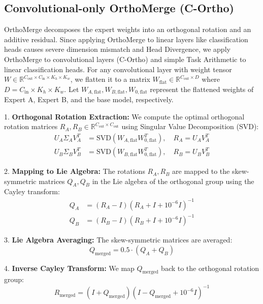 \documentclass{article}
\theoremstyle{plain}
\theoremstyle{definition}
\theoremstyle{remark}
\begin{document}
\subsection{Convolutional-only OrthoMerge (C-Ortho)}
OrthoMerge \cite{yang2026orthogonal} decomposes the expert weights into an orthogonal rotation and an additive residual. Since applying OrthoMerge to linear layers like classification heads causes severe dimension mismatch and Head Divergence, we apply OrthoMerge to convolutional layers (C-Ortho) and simple Task Arithmetic to linear classification heads.
For any convolutional layer with weight tensor $W \in \mathbb{R}^{C_{\text{out}} \times C_{\text{in}} \times K_h \times K_w}$, we flatten it to a matrix $W_{\text{flat}} \in \mathbb{R}^{C_{\text{out}} \times D}$ where $D = C_{\text{in}} \times K_h \times K_w$.
Let $W_{A,\text{flat}}, W_{B,\text{flat}}, W_{0,\text{flat}}$ represent the flattened weights of Expert A, Expert B, and the base model, respectively.

1. \textbf{Orthogonal Rotation Extraction:} We compute the optimal orthogonal rotation matrices $R_A, R_B \in \mathbb{R}^{C_{\text{out}} \times C_{\text{out}}}$ using Singular Value Decomposition (SVD):
\begin{align}
    U_A \Sigma_A V_A^T &= \text{SVD}(W_{A,\text{flat}} W_{0,\text{flat}}^T), \quad R_A = U_A V_A^T \\
    U_B \Sigma_B V_B^T &= \text{SVD}(W_{B,\text{flat}} W_{0,\text{flat}}^T), \quad R_B = U_B V_B^T
\end{align}

2. \textbf{Mapping to Lie Algebra:} The rotations $R_A, R_B$ are mapped to the skew-symmetric matrices $Q_A, Q_B$ in the Lie algebra of the orthogonal group using the Cayley transform:
\begin{align}
    Q_A &= (R_A - I)(R_A + I + 10^{-6} I)^{-1} \\
    Q_B &= (R_B - I)(R_B + I + 10^{-6} I)^{-1}
\end{align}

3. \textbf{Lie Algebra Averaging:} The skew-symmetric matrices are averaged:
\begin{equation}
    Q_{\text{merged}} = 0.5 \cdot (Q_A + Q_B)
\end{equation}

4. \textbf{Inverse Cayley Transform:} We map $Q_{\text{merged}}$ back to the orthogonal rotation group:
\begin{equation}
    R_{\text{merged}} = (I + Q_{\text{merged}})(I - Q_{\text{merged}} + 10^{-6} I)^{-1}
\end{equation}
\end{document}
